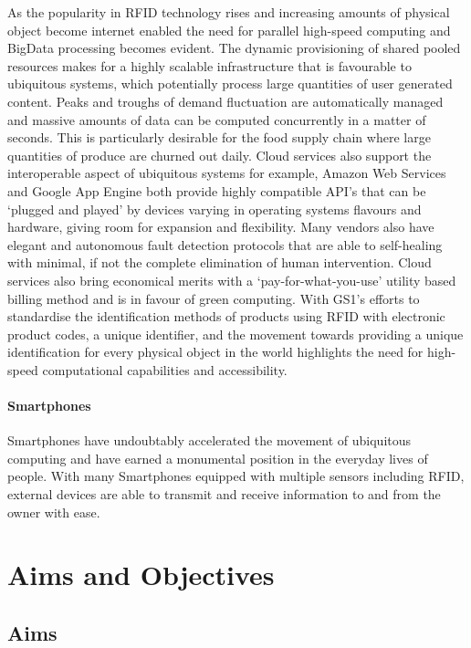 \documentclass[a4paper, 11pt]{article}
\begin{document}
As the popularity in RFID technology rises and increasing amounts of physical object become internet enabled the need for parallel high-speed computing and BigData processing becomes evident. The dynamic provisioning of shared pooled resources makes for a highly scalable infrastructure that is favourable to ubiquitous systems, which potentially process large quantities of user generated content. Peaks and troughs of demand fluctuation are automatically managed and massive amounts of data can be computed concurrently in a matter of seconds. This is particularly desirable for the food supply chain where large quantities of produce are churned out daily. Cloud services also support the interoperable aspect of ubiquitous systems for example, Amazon Web Services and Google App Engine both provide highly compatible API's that can be `plugged and played' by devices varying in operating systems flavours and hardware, giving room for expansion and flexibility. Many vendors also have elegant and autonomous fault detection protocols that are able to self-healing with minimal, if not the complete elimination of human intervention. Cloud services also bring economical merits with a `pay-for-what-you-use' utility based billing method and is in favour of green computing.\cite{CAYS} With GS1's efforts to standardise the identification methods of products using RFID with electronic product codes, a unique identifier, and the movement towards providing a unique identification for every physical object in the world highlights the need for high-speed computational capabilities and accessibility.\cite{GS1}

\paragraph{Smartphones}Smartphones have undoubtably accelerated the movement of ubiquitous computing and have earned a monumental position in the everyday lives of people. With many Smartphones equipped with multiple sensors including RFID, external devices are able to transmit and receive information to and from the owner with ease. 


\clearpage

\section{Aims and Objectives}
\subsection{Aims}
\end{document}
